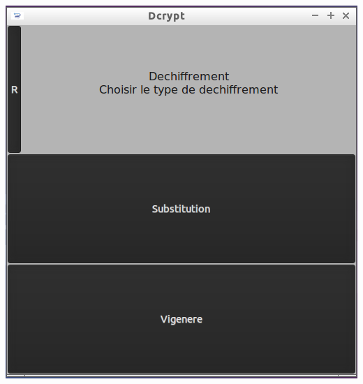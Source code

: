 \documentclass[a4]{article}
\begin{document}
		\begin{center}\includegraphics[scale=0.4]{9.png}\end{center}
\end{document}
